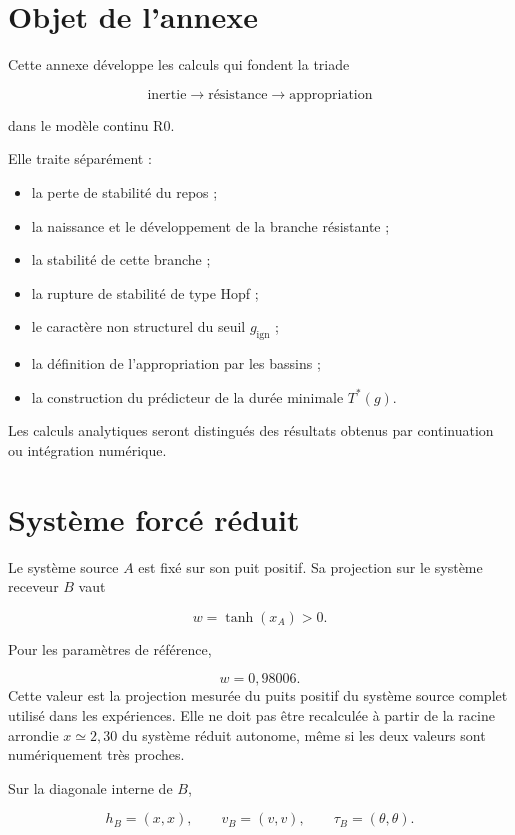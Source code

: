 \section{Objet de l'annexe}
\label{annexe-resistance-objet}

Cette annexe développe les calculs qui fondent la triade

\[
\text{inertie}
\longrightarrow
\text{résistance}
\longrightarrow
\text{appropriation}
\]

dans le modèle continu R0.

Elle traite séparément :

\begin{itemize}
\item
  la perte de stabilité du repos ;
\item
  la naissance et le développement de la branche résistante ;
\item
  la stabilité de cette branche ;
\item
  la rupture de stabilité de type Hopf ;
\item
  le caractère non structurel du seuil \(g_{\mathrm{ign}}\) ;
\item
  la définition de l'appropriation par les bassins ;
\item
  la construction du prédicteur de la durée minimale
  \(T^\ast(g)\).
\end{itemize}

Les calculs analytiques seront distingués des résultats obtenus par
continuation ou intégration numérique.

\section{Système forcé réduit}
\label{annexe-resistance-systeme}

Le système source \(A\) est fixé sur son puit positif. Sa projection sur le système receveur \(B\) vaut

\[
w=\tanh(x_A)>0.
\]

Pour les paramètres de référence,

\[
w=0{,}98006.
\]
Cette valeur est la projection mesurée du puits positif du système
source complet utilisé dans les expériences. Elle ne doit pas être
recalculée à partir de la racine arrondie \(x\simeq2{,}30\) du système
réduit autonome, même si les deux valeurs sont numériquement très
proches.

Sur la diagonale interne de \(B\),

\[
h_B=(x,x),
\qquad
v_B=(v,v),
\qquad
\tau_B=(\theta,\theta).
\]

